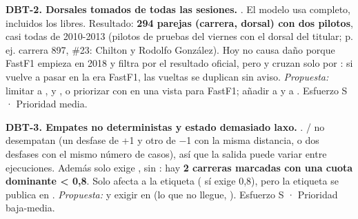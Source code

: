 \textbf{DBT-2. Dorsales tomados de todas las sesiones.} . El modelo usa  completo, incluidos los libres. Resultado: \textbf{294 parejas (carrera, dorsal) con dos pilotos}, casi todas de 2010-2013 (pilotos de pruebas del viernes con el dorsal del titular; p. ej. carrera 897, \#23: Chilton y Rodolfo González). Hoy no causa daño porque FastF1 empieza en 2018 y  filtra por el resultado oficial, pero  y  cruzan solo por : si vuelve a pasar en la era FastF1, las vueltas se duplican sin aviso. \emph{Propuesta:} limitar a ,  y , o priorizar con  en una vista para FastF1; añadir  a  y  a . Esfuerzo S · Prioridad media.

\textbf{DBT-3. Empates no deterministas y estado  demasiado laxo.} . / no desempatan (un desfase de +1 y otro de −1 con la misma distancia, o dos desfases con el mismo número de casos), así que la salida puede variar entre ejecuciones. Además  solo exige , sin : hay \textbf{2 carreras marcadas  con una cuota dominante < 0,8}. Solo afecta a la etiqueta ( sí exige 0,8), pero la etiqueta se publica en . \emph{Propuesta:}  y exigir  en  (lo que no llegue, ). Esfuerzo S · Prioridad baja-media.

